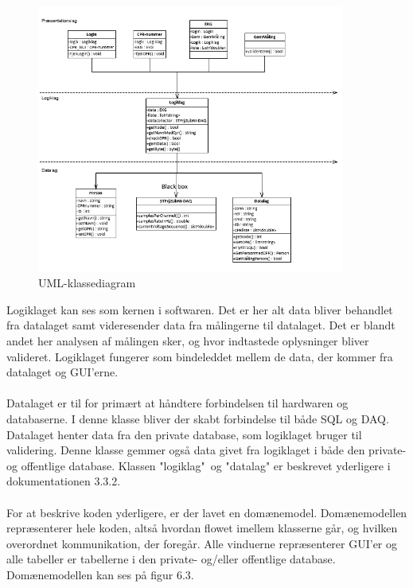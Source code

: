 \begin{figure}[H]
	\centering
	\includegraphics[width=0.9\textwidth]{Figurer/Snip20150527_29}
	\caption{UML-klassediagram}
\end{figure}
 
Logiklaget kan ses som kernen i softwaren. Det er her alt data bliver behandlet fra datalaget samt videresender data fra målingerne til datalaget. Det er blandt andet her analysen af målingen sker, og hvor indtastede oplysninger bliver valideret. Logiklaget fungerer som bindeleddet mellem de data, der kommer fra datalaget og GUI’erne. \\ \\
Datalaget er til for primært at håndtere forbindelsen til hardwaren og databaserne. I denne klasse bliver der skabt forbindelse til både SQL og DAQ. Datalaget henter data fra den private database, som logiklaget bruger til validering. Denne klasse gemmer også data givet fra logiklaget i både den private- og offentlige database. Klassen "logiklag"\  og "datalag" er beskrevet yderligere i dokumentationen 3.3.2. \\ \\
For at beskrive koden yderligere, er der lavet en domænemodel. Domænemodellen repræsenterer hele koden, altså hvordan flowet imellem klasserne går, og hvilken overordnet kommunikation, der foregår. Alle vinduerne repræsenterer GUI’er og alle tabeller er tabellerne i den private- og/eller offentlige database. Domænemodellen kan ses på figur 6.3. 

